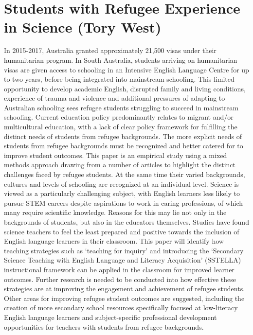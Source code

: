 \documentclass[twoside,12pt,a4paper,notitlepage]{memoir}
\begin{document}
\pagebreak
\section*{Students with Refugee Experience in Science (Tory West)}
\label{aut:west}

In 2015-2017, Australia granted approximately 21,500 visas under their humanitarian program. In South Australia, students arriving on humanitarian visas are given access to schooling in an Intensive English Language Centre for up to two years, before being integrated into mainstream schooling. This limited opportunity to develop academic English, disrupted family and living conditions, experience of trauma and violence and additional pressures of adapting to Australian schooling sees refugee students struggling to succeed in mainstream schooling.
Current education policy predominantly relates to migrant and/or multicultural education, with a lack of clear policy framework for fulfilling the distinct needs of students from refugee backgrounds. The more explicit needs of students from refugee backgrounds must be recognized and better catered for to improve student outcomes.
This paper is an empirical study using a mixed methods approach drawing from a number of articles to highlight the distinct challenges faced by refugee students. At the same time their varied backgrounds, cultures and levels of schooling are recognized at an individual level.
Science is viewed as a particularly challenging subject, with English learners less likely to pursue STEM careers despite aspirations to work in caring professions, of which many require scientific knowledge. Reasons for this may lie not only in the backgrounds of students, but also in the educators themselves. Studies have found science teachers to feel the least prepared and positive towards the inclusion of English language learners in their classroom. This paper will identify how teaching strategies such as ‘teaching for inquiry’ and introducing the ‘Secondary Science Teaching with English Language and Literacy Acquisition’ (SSTELLA) instructional framework can be applied in the classroom for improved learner outcomes. Further research is needed to be conducted into how effective these strategies are at improving the engagement and achievement of refugee students. Other areas for improving refugee student outcomes are suggested, including the creation of more secondary school resources specifically focused at low-literacy English language learners and subject-specific professional development opportunities for teachers with students from refugee backgrounds.
\end{document}
